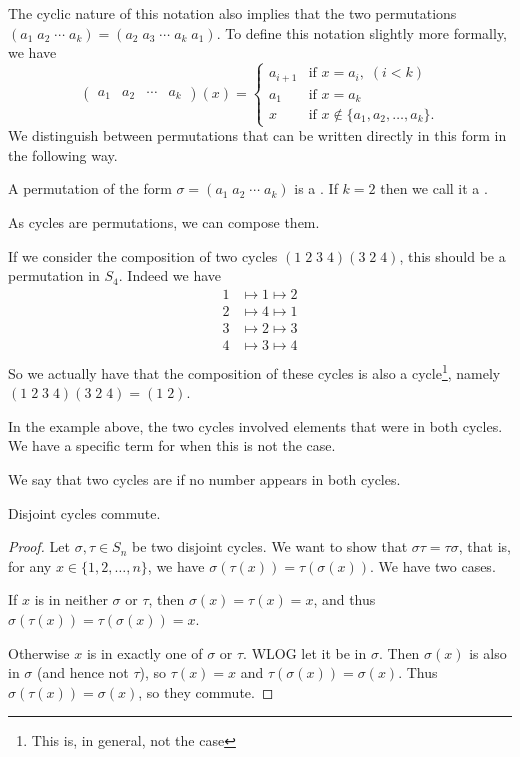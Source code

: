 The cyclic nature of this notation also implies that the two permutations $(a_1\; a_2\; \cdots\; a_k) = (a_2\; a_3\; \cdots\; a_k\; a_1)$. To define this notation slightly more formally, we have
$$
\begin{pmatrix}
	a_1 & a_2 & \cdots & a_k
\end{pmatrix} (x) = \begin{cases}
	a_{i + 1} &\mbox{if } x = a_i, \; (i < k) \\
	a_1 &\mbox{if } x = a_k \\
	x &\mbox{if } x \not \in \{a_1, a_2, \dots, a_k\}.
   \end{cases}
$$
We distinguish between permutations that can be written directly in this form in the following way.
\begin{definition}
	A permutation of the form $\sigma = (a_1\; a_2\; \cdots\; a_k)$ is a . If $k = 2$ then we call it a .
\end{definition}

As cycles are permutations, we can compose them.
\begin{example}
If we consider the composition of two cycles $(1\; 2\; 3\; 4)(3 \; 2\; 4)$, this should be a permutation in $S_4$. Indeed we have
\begin{align*}
	1 &\longmapsto 1 \longmapsto 2 \\
	2 &\longmapsto 4 \longmapsto 1 \\
	3 &\longmapsto 2 \longmapsto 3 \\
	4 &\longmapsto 3 \longmapsto 4 \\
\end{align*}
So we actually have that the composition of these cycles is also a cycle\footnote{This is, in general, not the case}, namely $(1\; 2\; 3\; 4)(3 \; 2\; 4) = (1\; 2)$. 
\end{example}

In the example above, the two cycles involved elements that were in both cycles. We have a specific term for when this is not the case.

\begin{definition}
	We say that two cycles are  if no number appears in both cycles.
\end{definition}
\begin{lemma}
	Disjoint cycles commute.
\end{lemma}
\begin{proof}
	Let $\sigma, \tau \in S_n$ be two disjoint cycles. We want to show that $\sigma \tau = \tau \sigma$, that is, for any $x \in \{1, 2, \dots, n\}$, we have $\sigma(\tau(x)) = \tau(\sigma(x))$. We have two cases.

	If $x$ is in neither $\sigma$ or $\tau$, then $\sigma(x) = \tau(x) = x$, and thus $\sigma(\tau(x)) = \tau(\sigma(x)) = x$.

	Otherwise $x$ is in exactly one of $\sigma$ or $\tau$. WLOG let it be in $\sigma$. Then $\sigma(x)$ is also in $\sigma$ (and hence not $\tau$), so $\tau(x) = x$ and $\tau(\sigma(x)) = \sigma(x)$. Thus $\sigma(\tau(x)) = \sigma(x)$, so they commute.
\end{proof}

